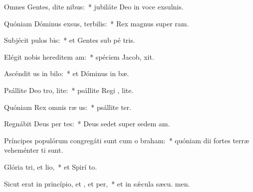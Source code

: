\item Omnes Gentes, dite nibus:~* jubiláte Deo in voce exsulnis.
\item Quóniam Dóminus exsus, terbilis:~* Rex magnus super  ram.
\item Subjécit pulos bis:~* et Gentes sub pé tris.
\item Elégit nobis hereditem am:~* spéciem Jacob,  xit.
\item Ascéndit us in bilo:~* et Dóminus in  bæ.
\item Psállite Deo tro, lite:~* psállite Regi , lite.
\item Quóniam Rex omnis ræ us:~* psállite ter.
\item Regnábit Deus per tes:~* Deus sedet super sedem  am.
\item Príncipes populórum congregáti sunt cum o braham:~* quóniam dii fortes terræ veheménter ti sunt.
\item Glória tri, et lio,~* et Spirí to.
\item Sicut erat in princípio, et , et per,~* et in sǽcula sæcu. men.

